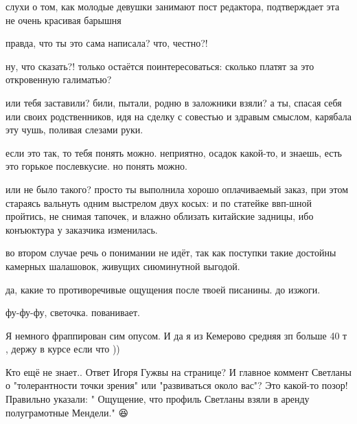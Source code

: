 \begin{itemize}
слухи о том, как молодые девушки занимают пост редактора, подтверждает эта не очень красивая барышня

 
правда, что ты это сама написала? что, честно?!

ну, что сказать?! только остаётся поинтересоваться: сколько платят за это
откровенную галиматью?

или тебя заставили? били, пытали, родню в заложники взяли? а ты, спасая себя
или своих родственников, идя на сделку с совестью и здравым смыслом, карябала
эту чушь, поливая слезами руки.

если это так, то тебя понять можно. неприятно, осадок какой-то, и знаешь, есть
это горькое послевкусие. но понять можно.

или не было такого? просто ты выполнила хорошо оплачиваемый заказ, при этом
стараясь вальнуть одним выстрелом двух косых: и по статейке ввп-шной пройтись,
не снимая тапочек, и влажно облизать китайские задницы, ибо конъюктура у
заказчика изменилась.

во втором случае речь о понимании не идёт, так как поступки такие достойны
камерных шалашовок, живущих сиюминутной выгодой.

да, какие то противоречивые ощущения после твоей писанины. до изжоги.

фу-фу-фу, светочка. пованивает.

 
Я немного фраппирован сим опусом. И да я из Кемерово средняя зп больше 40 т ,
держу в курсе если что ))


 

Кто ещё не знает.. Ответ Игоря Гужвы на странице? И главное коммент Светланы о
"толерантности точки зрения" или "развиваться около вас"? Это какой-то позор!
Правильно указали: " Ощущение, что профиль Светланы взяли в аренду
полуграмотные Мендели." 😆🤫


\end{itemize}
